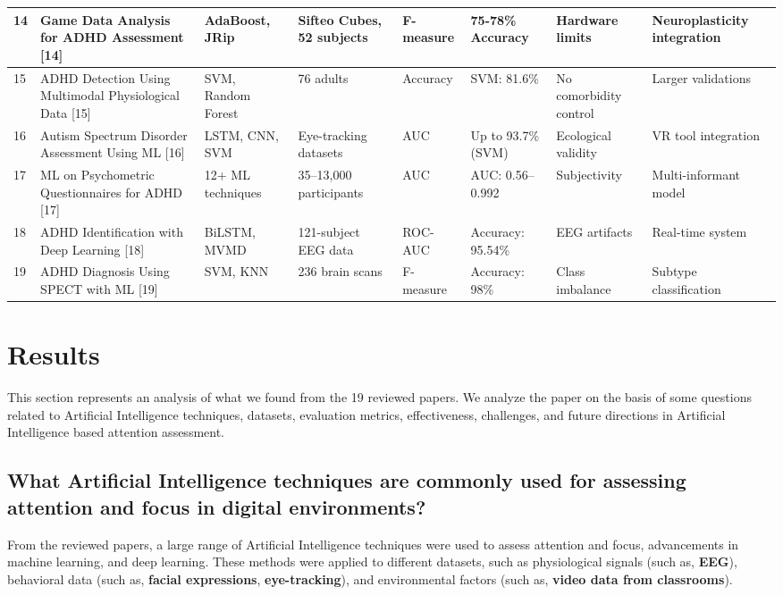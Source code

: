 \documentclass[12pt]{article}
\begin{document}
\begin{longtable}{|p{}|p{}|p{}|p{}|p{}|p{}|p{}|p{}|}
\hline
14 & Game Data Analysis for ADHD Assessment [14] & AdaBoost, JRip & Sifteo Cubes, 52 subjects & F-measure & 75-78\% Accuracy & Hardware limits & Neuroplasticity integration \\
\hline
15 & ADHD Detection Using Multimodal Physiological Data [15] & SVM, Random Forest & 76 adults & Accuracy & SVM: 81.6\% & No comorbidity control & Larger validations \\
\hline
16 & Autism Spectrum Disorder Assessment Using ML [16] & LSTM, CNN, SVM & Eye-tracking datasets & AUC & Up to 93.7\% (SVM) & Ecological validity & VR tool integration \\
\hline
17 & ML on Psychometric Questionnaires for ADHD [17] & 12+ ML techniques & 35–13,000 participants & AUC & AUC: 0.56–0.992 & Subjectivity & Multi-informant model \\
\hline
18 & ADHD Identification with Deep Learning [18] & BiLSTM, MVMD & 121-subject EEG data & ROC-AUC & Accuracy: 95.54\% & EEG artifacts & Real-time system \\
\hline
19 & ADHD Diagnosis Using SPECT with ML [19] & SVM, KNN & 236 brain scans & F-measure & Accuracy: 98\% & Class imbalance & Subtype classification \\
\hline
\end{longtable}

\section{Results}
This section represents an analysis of what we found from the 19 reviewed papers. We analyze the paper on the basis of some questions related to Artificial Intelligence techniques, datasets, evaluation metrics, effectiveness, challenges, and future directions in Artificial Intelligence based attention assessment.

\subsection{What Artificial Intelligence techniques are commonly used for assessing attention and focus in digital environments?}
From the reviewed papers, a large range of Artificial Intelligence techniques were used to assess attention and focus, advancements in machine learning, and deep learning. These methods were applied to different datasets, such as physiological signals (such as, \textbf{EEG}), behavioral data (such as, \textbf{facial expressions}, \textbf{eye-tracking}), and environmental factors (such as, \textbf{video data from classrooms}).
\end{document}
